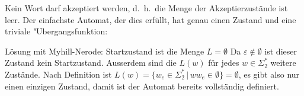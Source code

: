 \begin{loesung}
\begin{teilaufgaben}
\item Kein Wort darf akzeptiert werden, d.~h.~die Menge der Akzeptierzustände
ist leer. Der einfachste Automat, der dies erfüllt, hat genau einen
Zustand und eine triviale "Ubergangsfunktion:
\begin{center}
\end{center}
Lösung mit Myhill-Nerode: Startzustand ist die Menge $L=\emptyset$
Da $\varepsilon\not\in\emptyset$ ist dieser Zustand kein Startzustand.
Ausserdem sind die $L(w)$ für jedes $w\in\Sigma_2^*$ weitere Zustände.
Nach Definition ist $L(w)=\{w_e\in\Sigma_2^*\,|\,ww_e\in \emptyset\}=\emptyset$,
es gibt also nur einen einzigen Zustand, damit ist der Automat bereits
vollständig definiert.
\qedhere
\end{teilaufgaben}
\end{loesung}

